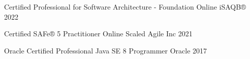 
\begin{cvhonors}

  \cvhonor
    {Certified Professional for Software Architecture - Foundation} %
    {Online} %
    {iSAQB®} %
    {2022} %
    
  \cvhonor
    {Certified SAFe® 5 Practitioner} %
    {Online} %
    {Scaled Agile Inc} %
    {2021} %

  \cvhonor
    {Oracle Certified Professional} %
    {Java SE 8 Programmer} %
    {Oracle} %
    {2017} %

\end{cvhonors}
